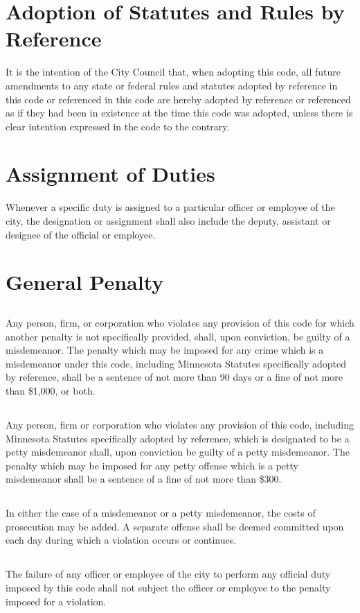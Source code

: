 \section{Adoption of Statutes and Rules by Reference}
It is the intention of the City Council that, when adopting this code, all future amendments to any state or federal rules and statutes adopted by reference in this code or referenced in this code are hereby adopted by reference or referenced as if they had been in existence at the time this code was adopted, unless there is clear intention expressed in the code to the contrary.



\section{Assignment of Duties}
Whenever a specific duty is assigned to a particular officer or employee of the city, the designation or assignment shall also include the deputy, assistant or designee of the official or employee.


\setcounter{section}{98}
\section{General Penalty}
\subsection{}
Any person, firm, or corporation who violates any provision of this code for which another penalty is not specifically provided, shall, upon conviction, be guilty of a misdemeanor.  The penalty which may be imposed for any crime which is a misdemeanor under this code, including Minnesota Statutes specifically adopted by reference, shall be a sentence of not more than 90 days or a fine of not more than \$1,000, or both.
\subsection{}
Any person, firm or corporation who violates any provision of this code, including Minnesota Statutes specifically adopted by reference, which is designated to be a petty misdemeanor shall, upon conviction be guilty of a petty misdemeanor.  The penalty which may be imposed for any petty offense which is a petty misdemeanor shall be a sentence of a fine of not more than \$300.
\subsection{}
In either the case of a misdemeanor or a petty misdemeanor, the costs of prosecution may be added.  A separate offense shall be deemed committed upon each day during which a violation occurs or continues.
\subsection{}
The failure of any officer or employee of the city to perform any official duty imposed by this code shall not subject the officer or employee to the penalty imposed for a violation.
